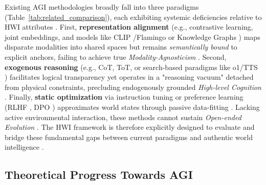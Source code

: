 Existing AGI methodologies broadly fall into three paradigms (Table~\ref{tab:related_comparison}), each exhibiting systemic deficiencies relative to HWI attributes \cite{marcus2020next}.
First, \textbf{representation alignment} (e.g., contrastive learning, joint embeddings, and models like CLIP \cite{radford2021learning}/Flamingo \cite{alayrac2022flamingo} or Knowledge Graphs \cite{ji2021survey}) maps disparate modalities into shared spaces but remains \emph{semantically bound} to explicit anchors, failing to achieve true \emph{Modality-Agnosticism} \cite{yuksekgonul2022and}.
Second, \textbf{exogenous reasoning} (e.g., CoT, ToT, or search-based paradigms like o1/TTS \cite{snell2024scaling}) facilitates logical transparency yet operates in a "reasoning vacuum" detached from physical constraints, precluding endogenously grounded \emph{High-level Cognition} \cite{pearl2018theoretical}.
Finally, \textbf{static optimization} via instruction tuning or preference learning (RLHF \cite{ouyang2022training}, DPO \cite{rafailov2023direct}) approximates world states through passive data-fitting \cite{bender2020climbing}. Lacking active environmental interaction, these methods cannot sustain \emph{Open-ended Evolution} \cite{lehman2011abandoning}.
The HWI framework is therefore explicitly designed to evaluate and bridge these fundamental gaps between current paradigms and authentic world intelligence \cite{bisk2020experience}.

\vspace{-2mm}
\subsection{Theoretical Progress Towards AGI}

